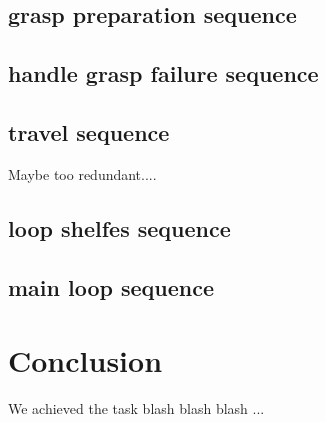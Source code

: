 \documentclass[main.tex]{subfiles}
\begin{document}
	\subsection{grasp preparation sequence}
	\subsection{handle grasp failure sequence}
	\subsection{travel sequence}
	Maybe too redundant....
	\subsection{loop shelfes sequence}
	\subsection{main loop sequence}
	
	\section{Conclusion}

	We achieved the task blash blash blash ...
	
	
	\endgroup
	
\end{document}

